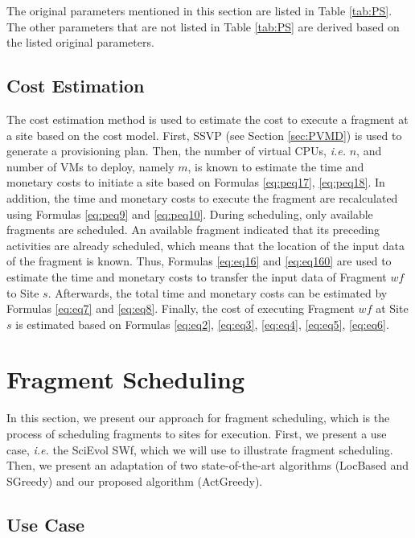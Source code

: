 The original parameters mentioned in this section are listed in Table \ref{tab:PS}. The other parameters that are not listed in Table \ref{tab:PS} are derived based on the listed original parameters.

\subsection{Cost Estimation}
\label{subsec:CE}
The cost estimation method is used to estimate the cost to execute a fragment at a site based on the cost model. First, SSVP (see Section \ref{sec:PVMD}) is used to generate a provisioning plan. Then, the number of virtual CPUs, \textit{i.e.} $n$, and number of VMs to deploy, namely $m$, is known to estimate the time and monetary costs to initiate a site based on Formulas \ref{eq:peq17}, \ref{eq:peq18}. In addition, the time and monetary costs to execute the fragment are recalculated using Formulas \ref{eq:peq9} and \ref{eq:peq10}. During scheduling, only available fragments are scheduled. An available fragment indicated that its preceding activities are already scheduled, which means that the location of the input data of the fragment is known. Thus, Formulas \ref{eq:eq16} and \ref{eq:eq160} are used to estimate the time and monetary costs to transfer the input data of Fragment $wf$ to Site $s$. Afterwards, the total time and monetary costs can be estimated by Formulas \ref{eq:eq7} and \ref{eq:eq8}. Finally, the cost of executing Fragment $wf$ at Site $s$ is estimated based on Formulas \ref{eq:eq2}, \ref{eq:eq3}, \ref{eq:eq4}, \ref{eq:eq5}, \ref{eq:eq6}.


\section{Fragment Scheduling}
\label{sec:SWfFS}
In this section, we present our approach for fragment scheduling, which is the process of scheduling fragments to sites for execution. First, we present a use case, \textit{i.e.} the SciEvol SWf, which we will use to illustrate fragment scheduling. Then, we present an adaptation of two state-of-the-art algorithms (LocBased and SGreedy) and our proposed algorithm (ActGreedy).

\subsection{Use Case}
\label{subsec:UC}


